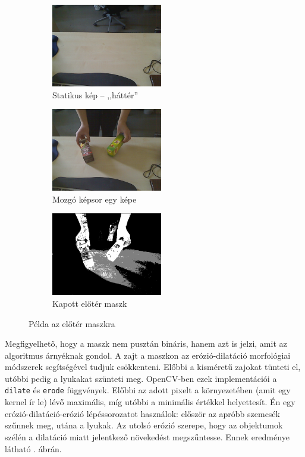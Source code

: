 \begin{figure}[tbh]
\centering
\begin{subfigure}[b]{.32\linewidth}
	\centering
	\includegraphics[width=137pt]{figures/image230.png}
	\caption{Statikus kép -- ,,háttér''}
  \end{subfigure}
\begin{subfigure}[b]{.32\linewidth}
	\centering
	\includegraphics[width=137pt]{figures/image343.png}
	\caption{Mozgó képsor egy képe}
  \end{subfigure}
\begin{subfigure}[b]{.32\linewidth}
	\centering
	\includegraphics[width=137pt]{figures/mask343.png}
	\caption{Kapott előtér maszk}
  \end{subfigure}
\caption{Példa az előtér maszkra \label{fig:my_mog2}}
\end{figure}

Megfigyelhető, hogy a maszk nem pusztán bináris, hanem azt is jelzi, amit az algoritmus árnyéknak gondol. A zajt a maszkon az erózió-dilatáció morfológiai módszerek segítségével tudjuk csökkenteni. Előbbi a kisméretű zajokat tünteti el, utóbbi pedig a lyukakat szünteti meg. OpenCV-ben ezek implementációi a \texttt{dilate} és \texttt{erode} függvények. Előbbi az adott pixelt a környezetében (amit egy kernel ír le) lévő maximális, míg utóbbi a minimális értékkel helyettesít. Én egy erózió-dilatáció-erózió lépéssorozatot használok: először az apróbb szemcsék szűnnek meg, utána a lyukak. Az utolsó erózió szerepe, hogy az objektumok szélén a dilatáció miatt jelentkező növekedést megszűntesse. Ennek eredménye látható . ábrán.

